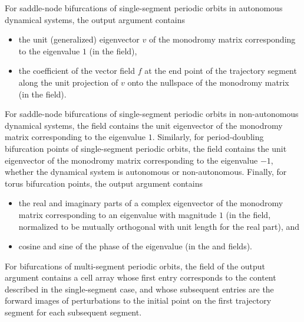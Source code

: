 For saddle-node bifurcations of single-segment periodic orbits in autonomous dynamical systems, the  output argument contains
\begin{itemize}
\item the unit (generalized) eigenvector $v$ of the monodromy matrix corresponding to the eigenvalue $1$ (in the  field),
\item the coefficient of the vector field $f$ at the end point of the trajectory segment along the unit projection of $v$ onto the nullspace of the monodromy matrix (in the  field).
\end{itemize}
For saddle-node bifurcations of single-segment periodic orbits in non-autonomous dynamical systems, the  field contains the unit eigenvector of the monodromy matrix corresponding to the eigenvalue $1$. Similarly, for period-doubling bifurcation points of single-segment periodic orbits, the field  contains the unit eigenvector of the monodromy matrix corresponding to the eigenvalue $-1$, whether the dynamical system is autonomous or non-autonomous. Finally, for torus bifurcation points, the  output argument contains
\begin{itemize}
\item the real and imaginary parts of a complex eigenvector of the monodromy matrix corresponding to an eigenvalue with magnitude $1$ (in the  field, normalized to be mutually orthogonal with unit length for the real part), and
\item cosine and sine of the phase of the eigenvalue (in the  and  fields).
\end{itemize}

For bifurcations of multi-segment periodic orbits, the  field of the  output argument contains a cell array whose first entry corresponds to the content described in the single-segment case, and whose subsequent entries are the forward images of perturbations to the initial point on the first trajectory segment for each subsequent segment.

